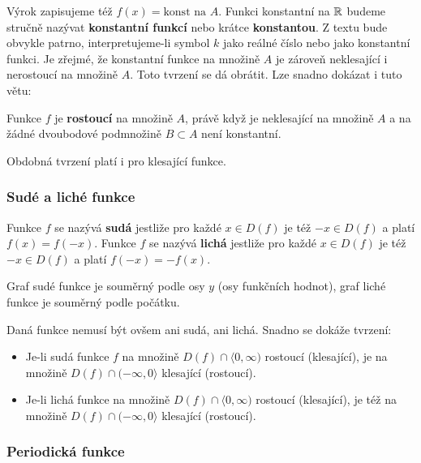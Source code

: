 {        Výrok  zapisujeme též $f(x)=\text{konst na }A$. 
        Funkci konstantní na $\mathbb{R}$ budeme stručně nazývat \textbf{konstantní funkcí} nebo 
        krátce \textbf{konstantou}. Z textu bude obvykle patrno, interpretujeme-li symbol $k$ jako 
        reálné číslo nebo jako konstantní funkci. Je zřejmé, že konstantní funkce na množině $A$ je 
        zároveň neklesající i nerostoucí na množině $A$. Toto tvrzení se dá obrátit. Lze snadno 
        dokázat i tuto větu:        
        \begin{lemma}\label{MA1:lem_lim01}
          Funkce $f$ je \textbf{rostoucí} na množině $A$, právě když je neklesající na množině $A$ a na žádné dvoubodové podmnožině $B\subset A$ není konstantní. 
        \end{lemma}
        Obdobná tvrzení platí i pro klesající funkce. 
               
      \subsubsection{Sudé a liché funkce}
        \begin{definition}\label{MA1:def_lim04}
          Funkce $f$ se nazývá \textbf{sudá} jestliže pro každé $x\in D(f)$ je též $-x\in D(f)$  a 
          platí $f(x)=f(-x)$.
          Funkce $f$ se nazývá \textbf{lichá} jestliže pro každé $x\in D(f)$ je též $-x\in D(f)$  a 
          platí $f(-x)=-f(x)$. 
        \end{definition}
        Graf sudé funkce je souměrný podle osy $y$ (osy funkčních hodnot), graf liché funkce je  
        souměrný podle počátku. 
 
         

        Daná funkce nemusí být ovšem ani sudá, ani lichá. Snadno se dokáže tvrzení:
        \begin{itemize}
          \item Je-li sudá funkce $f$ na množině $D(f)\cap\langle0,\infty)$ rostoucí (klesající),
                je na množině $D(f)\cap(-\infty,0\rangle$ klesající (rostoucí).
          \item Je-li lichá funkce na množině $D(f)\cap\langle0,\infty)$ rostoucí (klesající),
                je též na množině $D(f)\cap(-\infty,0\rangle$ klesající (rostoucí).                 
        \end{itemize}
      \subsubsection{Periodická funkce}

}
